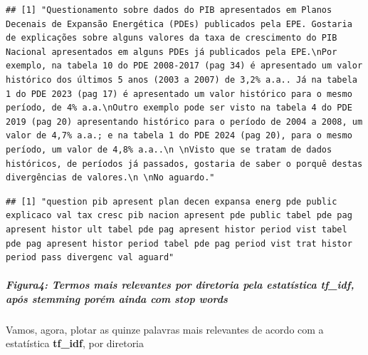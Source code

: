 \documentclass[]{article}
\newenvironment{Shaded}{\begin{snugshade}}{\end{snugshade}}
\newcommand{\DecValTok}[1]{\textcolor[rgb]{0.00,0.00,0.81}{#1}}
\newcommand{\NormalTok}[1]{#1}
\newcommand{\OperatorTok}[1]{\textcolor[rgb]{0.81,0.36,0.00}{\textbf{#1}}}
\let\oldsubparagraph\subparagraph
\renewcommand{\subparagraph}[1]{\oldsubparagraph{#1}\mbox{}}
\begin{document}
\begin{verbatim}
## [1] "Questionamento sobre dados do PIB apresentados em Planos Decenais de Expansão Energética (PDEs) publicados pela EPE. Gostaria de explicações sobre alguns valores da taxa de crescimento do PIB Nacional apresentados em alguns PDEs já publicados pela EPE.\nPor exemplo, na tabela 10 do PDE 2008-2017 (pag 34) é apresentado um valor histórico dos últimos 5 anos (2003 a 2007) de 3,2% a.a.. Já na tabela 1 do PDE 2023 (pag 17) é apresentado um valor histórico para o mesmo período, de 4% a.a.\nOutro exemplo pode ser visto na tabela 4 do PDE 2019 (pag 20) apresentando histórico para o período de 2004 a 2008, um valor de 4,7% a.a.; e na tabela 1 do PDE 2024 (pag 20), para o mesmo período, um valor de 4,8% a.a..\n \nVisto que se tratam de dados históricos, de períodos já passados, gostaria de saber o porquê destas divergências de valores.\n \nNo aguardo."
\end{verbatim}

\begin{Shaded}
\end{Shaded}

\begin{verbatim}
## [1] "question pib apresent plan decen expansa energ pde public explicaco val tax cresc pib nacion apresent pde public tabel pde pag apresent histor ult tabel pde pag apresent histor period vist tabel pde pag apresent histor period tabel pde pag period vist trat histor period pass divergenc val aguard"
\end{verbatim}

\hypertarget{figura4-termos-mais-relevantes-por-diretoria-pela-estatistica-tf_idf-apos-stemming-porem-ainda-com-stop-words}{%
\subparagraph{\texorpdfstring{Figura4: Termos mais relevantes por
diretoria pela estatística \textbf{tf\_idf}, após \textbf{stemming}
porém ainda com \textbf{stop
words}}{Figura4: Termos mais relevantes por diretoria pela estatística tf\_idf, após stemming porém ainda com stop words}}\label{figura4-termos-mais-relevantes-por-diretoria-pela-estatistica-tf_idf-apos-stemming-porem-ainda-com-stop-words}}

Vamos, agora, plotar as quinze palavras mais relevantes de acordo com a
estatística \textbf{tf\_idf}, por diretoria
\end{document}
